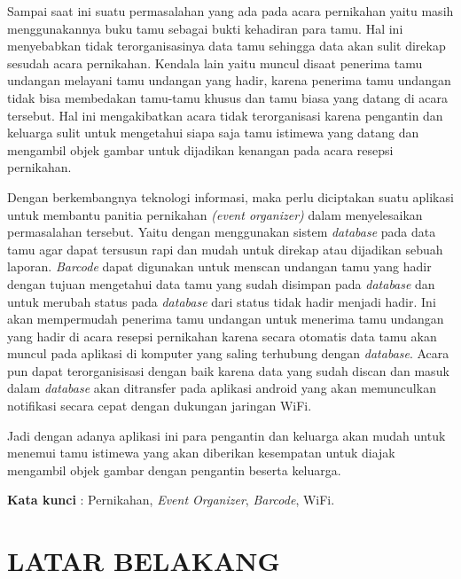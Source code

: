 \documentclass{jtetiproposalskripsi}
\begin{document}
\cover

\begin{abstractind}
Sampai saat ini suatu permasalahan yang ada pada acara pernikahan yaitu masih menggunakannya buku tamu sebagai bukti kehadiran para tamu. Hal ini menyebabkan tidak terorganisasinya data tamu sehingga data akan sulit direkap sesudah acara  pernikahan. Kendala lain yaitu muncul disaat penerima tamu undangan melayani tamu undangan yang hadir, karena penerima tamu undangan tidak bisa membedakan tamu-tamu khusus dan tamu biasa yang datang di acara tersebut. Hal ini mengakibatkan acara tidak terorganisasi karena pengantin dan keluarga sulit untuk mengetahui siapa saja tamu istimewa  yang datang dan mengambil objek gambar untuk dijadikan kenangan pada acara resepsi pernikahan.

Dengan berkembangnya teknologi informasi, maka perlu diciptakan suatu aplikasi untuk membantu panitia pernikahan \emph{(event organizer)} dalam menyelesaikan permasalahan tersebut. Yaitu dengan menggunakan sistem \emph{database} pada data tamu agar dapat tersusun rapi dan mudah untuk direkap atau dijadikan sebuah laporan. \emph{Barcode} dapat digunakan untuk menscan undangan tamu yang hadir dengan tujuan mengetahui data tamu yang sudah disimpan pada \emph{database} dan untuk merubah status pada \emph{database} dari status tidak hadir menjadi hadir. Ini akan mempermudah penerima tamu undangan untuk menerima tamu undangan yang hadir di acara resepsi pernikahan karena secara otomatis data tamu akan muncul pada aplikasi di komputer yang saling terhubung dengan \emph{database}. Acara pun dapat terorganisisasi dengan baik karena data yang sudah discan dan  masuk dalam \emph{database} akan ditransfer pada aplikasi android yang akan memunculkan notifikasi secara cepat dengan dukungan jaringan WiFi.

Jadi dengan adanya aplikasi ini para pengantin dan keluarga  akan mudah untuk menemui tamu istimewa yang akan diberikan kesempatan untuk  diajak mengambil objek gambar dengan pengantin beserta keluarga.


\bigskip
\textbf{Kata kunci} : Pernikahan, \emph{Event Organizer}, \emph{Barcode}, WiFi.
\end{abstractind}

\tableofcontents
{}
\clearpage{}\setcounter{page}{1}

\chapter{LATAR BELAKANG}
\end{document}
